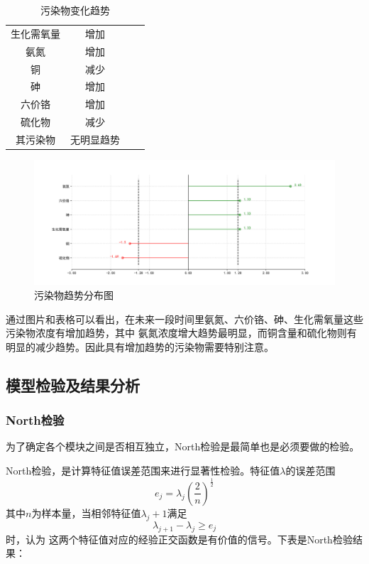 \documentclass{whutmod}
\begin{document}
\begin{spacing}{1.2}
\begin{table}[H]
	\centering
	\caption{污染物变化趋势}\footnotesize
	\begin{tabular}{cccc}\toprule[1.5pt]
		\makebox[0.3\textwidth][c]{污染物} & \makebox[0.4\textwidth][c]{变化趋势} \\ \hline
		生化需氧量 & 增加 \\
		氨氮  & 增加 \\
		铜   & 减少 \\
		砷   & 增加 \\
		六价铬 & 增加 \\
		硫化物 & 减少 \\
		其污染物&无明显趋势\\\bottomrule[1.5pt]	
	 \end{tabular}%
	\label{趋势}%
\end{table}%



\begin{figure}[H]
	\centering
	\includegraphics[width=.8\textwidth]{mk检验.png}
	\caption{污染物趋势分布图}
	\label{变化趋势}
\end{figure}

通过图片和表格可以看出，在未来一段时间里氨氮、六价铬、砷、生化需氧量这些污染物浓度有增加趋势，其中
氨氮浓度增大趋势最明显，而铜含量和硫化物则有明显的减少趋势。因此具有增加趋势的污染物需要特别注意。


\subsection{模型检验及结果分析}

\subsubsection{North检验}

为了确定各个模块之间是否相互独立，North检验是最简单也是必须要做的检验。

North检验，是计算特征值误差范围来进行显著性检验。特征值$\lambda$的误差范围
\begin{equation}\label{eq:dirchlet}
     e_j=\lambda_j(\frac{2}{n})^{\frac{1}{2}}
\end{equation}
其中$n$为样本量，当相邻特征值$\lambda_j+1$满足$$\lambda_{j+1}-\lambda_j\ge e_j$$时，认为
这两个特征值对应的经验正交函数是有价值的信号。下表是North检验结果：


\end{spacing}
\end{document}
